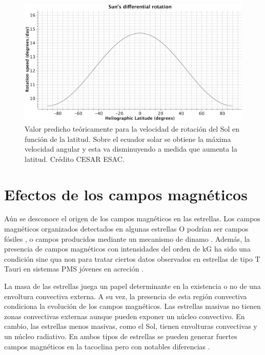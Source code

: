 \begin{figure}
    \centering
    \includegraphics[width=1.0\textwidth]{img/tesis/sun_3.png}
    \caption{Valor predicho teóricamente para la velocidad de rotación del Sol en función de la latitud. Sobre el ecuador solar se obtiene la máxima velocidad angular y esta va disminuyendo a medida que aumenta la latitud. Crédito CESAR ESAC.}
    \label{fig:ang_solar_vs_latitud}
\end{figure}


\section{Efectos de los campos magnéticos}
Aún se desconoce el origen de los campos magnéticos en las estrellas. Los campos magnéticos organizados detectados en algunas estrellas O \cite{Wade2010} podrían ser campos fósiles \cite[ver][para más detalles ]{Dudorov2014}, o campos producidos mediante un mecanismo de dinamo \cite{Cantiello2009}. Además, la presencia de campos magnéticos con intensidades del orden de kG \cite{Hussain2014} ha sido una condición sine qua non para tratar ciertos datos observados en estrellas de tipo T Tauri en sistemas PMS jóvenes en acreción \cite{Johns-Krull2007}.\par

La masa de las estrellas juega un papel determinante en la existencia o no de una envoltura convectiva externa. A su vez, la presencia de esta región convectiva condiciona la evolución de los campos magnéticos. Las estrellas masivas no tienen zonas convectivas externas aunque pueden exponer un núcleo convectivo. En cambio, las estrellas menos masivas, como el Sol, tienen envolturas convectivas y un núcleo radiativo. En ambos tipos de estrellas se pueden generar fuertes campos magnéticos en la tacoclina pero con notables diferencias \cite[v.g.][para más detalles]{Chabrier2006,Charbonneau2010}.\par

